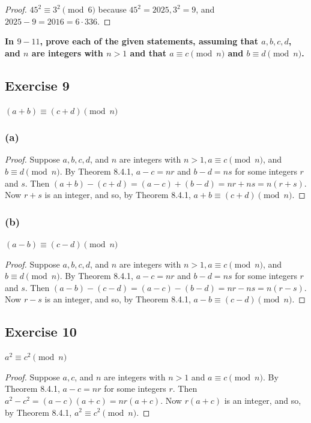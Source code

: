 \documentclass[14pt]{extarticle}
\newcommand{\cy}{\color{cyan}}
\begin{document}
\begin{proof}
\(45^2 \equiv 3^2 \pmod 6\) because \(45^2 = 2025, 3^2 = 9\), and \(2025 - 9 = 2016 = 6 \cdot 336\).
\end{proof}

{\bf \cy In $9-11$, prove each of the given statements, assuming that \(a, b, c, d\), and \(n\) are integers with 
\(n > 1\) and that \(a \equiv c \pmod n\) and \(b \equiv d \pmod n\).}

\subsection{Exercise 9}
\((a + b) \equiv (c + d) \pmod n\)

\subsubsection{(a)}

\begin{proof}
Suppose \(a, b, c, d\), and \(n\) are integers with \(n > 1, a \equiv c \pmod n\), and \(b \equiv d \pmod n\). By 
Theorem 8.4.1, \(a - c = nr\) and \(b - d = ns\) for some integers \(r\) and \(s\). Then \((a + b) - (c + d) = 
(a - c) + (b - d) = nr + ns = n(r + s)\). Now \(r + s\) is an integer, and so, by Theorem 8.4.1, 
\(a + b \equiv (c + d) \pmod n\).
\end{proof}

\subsubsection{(b)}
\((a - b) \equiv (c - d) \pmod n\)

\begin{proof}
Suppose \(a, b, c, d\), and \(n\) are integers with \(n > 1, a \equiv c \pmod n\), and \(b \equiv d \pmod n\). By 
Theorem 8.4.1, \(a - c = nr\) and \(b - d = ns\) for some integers \(r\) and \(s\). Then \((a - b) - (c - d) = 
(a - c) - (b - d) = nr - ns = n(r - s)\). Now \(r - s\) is an integer, and so, by Theorem 8.4.1, 
\(a - b \equiv (c - d) \pmod n\).
\end{proof}

\subsection{Exercise 10}
\(a^2 \equiv c^2 \pmod n\)

\begin{proof}
Suppose \(a, c\), and \(n\) are integers with \(n > 1\) and \(a \equiv c \pmod n\). By Theorem 8.4.1, \(a - c = nr\) 
for some integers \(r\). Then \(a^2-c^2 = (a-c)(a+c) = nr(a+c)\). Now \(r(a+c)\) is an integer, and so, by Theorem 
8.4.1, \(a^2 \equiv c^2 \pmod n\).
\end{proof}
\end{document}
